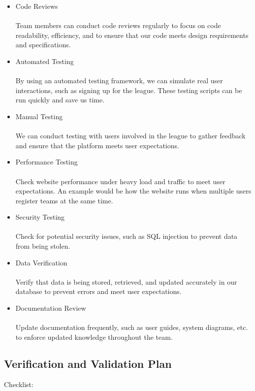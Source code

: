 \documentclass[12pt, titlepage]{article}
\begin{document}
\begin{itemize}
    \item Code Reviews 
        \\ \\Team members can conduct code reviews regularly to focus on code readability, efficiency, and to ensure that our code meets design requirements and specifications.
    \item Automated Testing
        \\ \\By using an automated testing framework, we can simulate real user interactions, such as signing up for the league. These testing scripts can be run quickly and save us time.
    \item Manual Testing
        \\ \\ We can conduct testing with users involved in the league to gather feedback and ensure that the platform meets user expectations.
    \item Performance Testing
        \\ \\Check website performance under heavy load and traffic to meet user expectations. An example would be how the website runs when multiple users register teams at the same time.
    \item Security Testing
        \\ \\Check for potential security issues, such as SQL injection to prevent data from being stolen.
    \item Data Verification
        \\ \\Verify that data is being stored, retrieved, and updated accurately in our database to prevent errors and meet user expectations.
    \item Documentation Review
        \\ \\Update documentation frequently, such as user guides, system diagrams, etc. to enforce updated knowledge throughout the team.
\end{itemize}

\subsection{Verification and Validation Plan}

Checklist:
\end{document}
